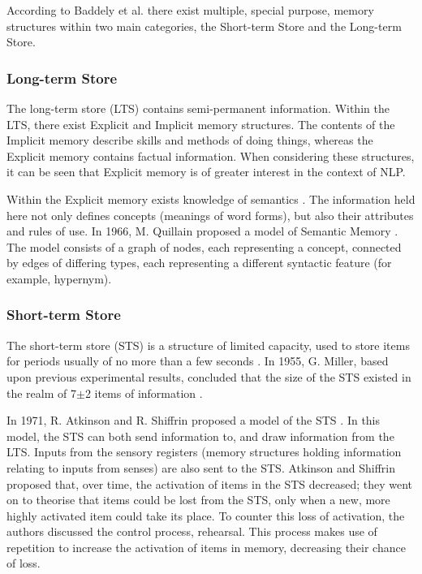 \documentclass[]{article}
\begin{document}
According to Baddely et al. \cite{MemoryBaddeleyEysenkAnderson} there exist multiple, special purpose, memory structures within two main categories, the Short-term Store and the Long-term Store.  

\subsubsection{Long-term Store}
\label{LongTerm}
The long-term store (LTS) contains semi-permanent information. Within the LTS, there exist Explicit and Implicit memory structures. The contents of the Implicit memory describe skills and methods of doing things, whereas the Explicit memory contains factual information\cite{MemoryBaddeleyEysenkAnderson}. When considering these structures, it can be seen that Explicit memory is of greater interest in the context of NLP.

Within the Explicit memory exists knowledge of semantics \cite{MemoryBaddeleyEysenkAnderson}. The information held here not only defines concepts (meanings of word forms), but also their attributes and rules of use. In 1966, M. Quillain proposed a model of Semantic Memory \cite{SemanticMemoryQuillain}. The model consists of a graph of nodes, each representing a concept, connected by edges of differing types, each representing a different syntactic feature (for example, hypernym). 


\subsubsection{Short-term Store}
\label{ShortTerm}
The short-term store (STS) is a structure of limited capacity, used to store items for periods usually of no more than a few seconds \cite{MemoryBaddeleyEysenkAnderson}. In 1955, G. Miller, based upon previous experimental results, concluded that the size of the STS existed in the realm of 7$\pm$2 items of information \cite{SevenPlusMinusTwo}. 

In 1971, R. Atkinson and R. Shiffrin proposed a model of the STS \cite{ControlProcessesSTMAtkinson}. In this model, the STS can both send information to, and draw information from the LTS. Inputs from the sensory registers (memory structures holding information relating to inputs from senses) are also sent to the STS. Atkinson and Shiffrin proposed that, over time, the activation of items in the STS decreased; they went on to theorise that items could be lost from the STS, only when a new, more highly activated item could take its place. To counter this loss of activation, the authors discussed the control process, rehearsal. This process makes use of repetition to increase the activation of items in memory, decreasing their chance of loss. 
\end{document}
